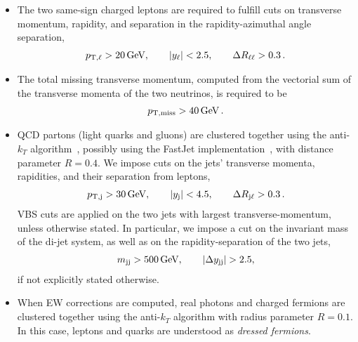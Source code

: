\begin{itemize}
    \item The two same-sign charged leptons are required to fulfill cuts on transverse momentum, rapidity, and separation in the rapidity-azimuthal angle separation, 
        \begin{align}
        \label{cut:1}
         p_{\text{T},\ell} >  20\,\text{GeV},\qquad |y_{\ell}| < 2.5, \qquad \Delta R_{\ell\ell}> 0.3\,.
        \end{align}
    \item The total missing transverse momentum, computed from the vectorial sum of the transverse momenta of the two neutrinos, is required to be
        \begin{align}
        \label{cut:2}
          p_{\rm T, miss} >  40\,\text{GeV}\,.
        \end{align}
    \item QCD partons (light quarks and gluons) are clustered together using the anti-$k_T$ algorithm~\cite{Cacciari:2008gp}, possibly using the {\sc FastJet} implementation~\cite{Cacciari:2011ma}, with distance parameter $R=0.4$. %
    We impose cuts on the jets' transverse momenta, rapidities, and their separation from leptons,  
        \begin{align}
        \label{cut:3}
         p_{\text{T},\text{j}} >  30\,\text{GeV}, \qquad |y_\text{j}| < 4.5, \qquad \Delta R_{\text{j}\ell} > 0.3 \,.
        \end{align}
        VBS cuts are applied on the two jets with largest transverse-momentum, unless otherwise stated. In particular, we impose a cut on the 
         in\-vari\-ant mass of the di-jet system,  as well as on the rapidity-separation of the two jets,          \begin{align}
        \label{cut:4}
         m_{\text{j} \text{j}} >  500\,\text{GeV},\qquad |\Delta y_{\text{j} \text{j}}| > 2.5, 
        \end{align}
        if not explicitly stated otherwise. 
    \item When EW corrections are computed, real photons and charged fermions are clustered together using the anti-$k_T$ algorithm with
        radius parameter $R=0.1$. In this case, leptons and quarks are understood as {\it dressed fermions}.
\end{itemize}
